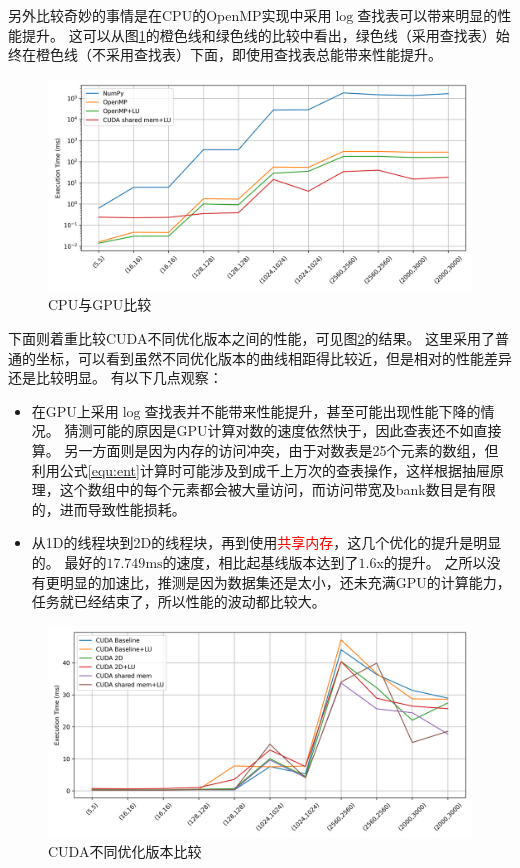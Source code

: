 \documentclass[logo,reportComp]{thesis}
\def\sharedmem{\textcolor{red}{\kaiti 共享内存}}
\def\constmem{\textcolor{blue}{\kaiti 常量内存}}
\begin{document}
另外比较奇妙的事情是在CPU的OpenMP实现中采用$\log$查找表可以带来明显的性能提升。
这可以从图\ref{fig:cpu}的橙色线和绿色线的比较中看出，绿色线（采用查找表）始终在橙色线（不采用查找表）下面，即使用查找表总能带来性能提升。
\begin{figure}[H]
\centering
\includegraphics[width=\linewidth]{fig/cpu-gpu.png}
\caption{CPU与GPU比较}
\label{fig:cpu}
\end{figure}

下面则着重比较CUDA不同优化版本之间的性能，可见图\ref{fig:cuda}的结果。
这里采用了普通的坐标，可以看到虽然不同优化版本的曲线相距得比较近，但是相对的性能差异还是比较明显。
有以下几点观察：
\begin{itemize}
	\item 在GPU上采用$\log$查找表并不能带来性能提升，甚至可能出现性能下降的情况。
	猜测可能的原因是GPU计算对数的速度依然快于，因此查表还不如直接算。
	另一方面则是因为内存的访问冲突，由于对数表是25个元素的数组，但利用公式\ref{equ:ent}计算时可能涉及到成千上万次的查表操作，这样根据抽屉原理，这个数组中的每个元素都会被大量访问，而访问带宽及bank数目是有限的，进而导致性能损耗。
	\item 从1D的线程块到2D的线程块，再到使用\sharedmem，这几个优化的提升是明显的。
	最好的$17.749\text{ms}$的速度，相比起基线版本达到了$1.6$x的提升。
	之所以没有更明显的加速比，推测是因为数据集还是太小，还未充满GPU的计算能力，任务就已经结束了，所以性能的波动都比较大。
\end{itemize}
\begin{figure}[H]
\centering
\includegraphics[width=\linewidth]{fig/cuda.png}
\caption{CUDA不同优化版本比较}
\label{fig:cuda}
\end{figure}
\end{document}
